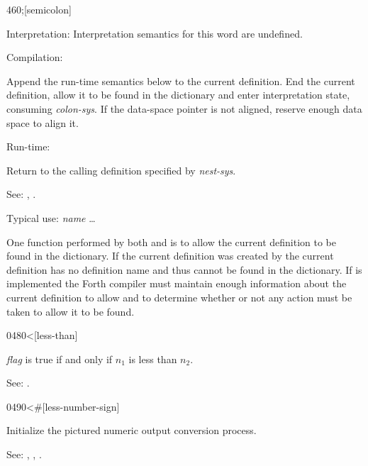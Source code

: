 \begin{newword*}{460}{;}[semicolon]
\item[Interpretation:]
	Interpretation semantics for this word are undefined.

\item[Compilation:]

	Append the run-time semantics below to the current definition.
	End the current definition, allow it to be found in the
	dictionary and enter interpretation state, consuming
	\emph{colon-sys}. If the data-space pointer is not aligned,
	reserve enough data space to align it.

\item[Run-time:]
	\stack{}{}

	Return to the calling definition specified by \emph{nest-sys}.

\item[See:]
	,
	.

	\begin{rationale} %
		Typical use:
			\word{:} \emph{name} {\ldots} \word{;}

		One function performed by both \word{;} and 
		is to allow the current definition to be found in the
		dictionary. If the current definition was created by
		 the current definition has no definition name
		and thus cannot be found in the dictionary. If 
		is implemented the Forth compiler must maintain enough
		information about the current definition to allow \word{;} and
		 to determine whether or not any action must
		be taken to allow it to be found.
	\end{rationale}
\end{newword*}


\begin{newword}[less]{0480}{<}[less-than]

	\emph{flag} is true if and only if $n_1$ is less than $n_2$.

\item[See:]
	.
\end{newword}

\begin{newword}{0490}{<\#}[less-number-sign]
	\stack{}{}

	Initialize the pictured numeric output conversion process.

\item[See:]
	,
	,
	.
\end{newword}



